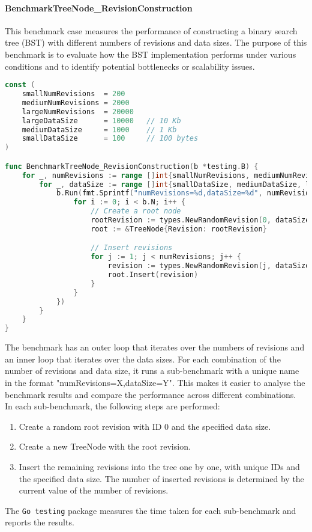 
\paragraph{BenchmarkTreeNode\_RevisionConstruction}
This benchmark case measures the performance of constructing a binary search tree (BST) with different numbers of revisions and data sizes. The purpose of this benchmark is to evaluate how the BST implementation performs under various conditions and to identify potential bottlenecks or scalability issues.

\begin{lstlisting}[language=go]
const (
	smallNumRevisions  = 200
	mediumNumRevisions = 2000
	largeNumRevisions  = 20000
	largeDataSize      = 10000   // 10 Kb
	mediumDataSize     = 1000    // 1 Kb
	smallDataSize      = 100     // 100 bytes
)

func BenchmarkTreeNode_RevisionConstruction(b *testing.B) {
	for _, numRevisions := range []int{smallNumRevisions, mediumNumRevisions, largeNumRevisions} {
		for _, dataSize := range []int{smallDataSize, mediumDataSize, largeDataSize} {
			b.Run(fmt.Sprintf("numRevisions=%d,dataSize=%d", numRevisions, dataSize), func(b *testing.B) {
				for i := 0; i < b.N; i++ {
					// Create a root node
					rootRevision := types.NewRandomRevision(0, dataSize)
					root := &TreeNode{Revision: rootRevision}

					// Insert revisions
					for j := 1; j < numRevisions; j++ {
						revision := types.NewRandomRevision(j, dataSize)
						root.Insert(revision)
					}
				}
			})
		}
	}
}
\end{lstlisting}

The benchmark has an outer loop that iterates over the numbers of revisions and an inner loop that iterates over the data sizes. For each combination of the number of revisions and data size, it runs a sub-benchmark with a unique name in the format "numRevisions=X,dataSize=Y". This makes it easier to analyse the benchmark results and compare the performance across different combinations.
\\

In each sub-benchmark, the following steps are performed:
\begin{enumerate}
    \item Create a random root revision with ID 0 and the specified data size.
    \item Create a new TreeNode with the root revision.
    \item Insert the remaining revisions into the tree one by one, with unique IDs and the specified data size. The number of inserted revisions is determined by the current value of the number of revisions.
\end{enumerate}
The \lstinline{Go testing} package measures the time taken for each sub-benchmark and reports the results.


